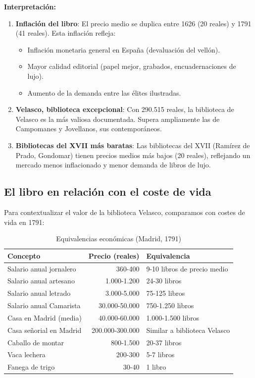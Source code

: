 \documentclass[11pt,a4paper]{article}
\begin{document}
\textbf{Interpretación:}

\begin{enumerate}
\item \textbf{Inflación del libro}: El precio medio se duplica entre 1626 (20 reales) y 1791 (41 reales). Esta inflación refleja:
\begin{itemize}
\item Inflación monetaria general en España (devaluación del vellón).
\item Mayor calidad editorial (papel mejor, grabados, encuadernaciones de lujo).
\item Aumento de la demanda entre las élites ilustradas.
\end{itemize}

\item \textbf{Velasco, biblioteca excepcional}: Con 290.515 reales, la biblioteca de Velasco es la más valiosa documentada. Supera ampliamente las de Campomanes y Jovellanos, sus contemporáneos.

\item \textbf{Bibliotecas del XVII más baratas}: Las bibliotecas del XVII (Ramírez de Prado, Gondomar) tienen precios medios más bajos (20 reales), reflejando un mercado menos inflacionado y menor demanda de libros de lujo.
\end{enumerate}

\subsection{El libro en relación con el coste de vida}

Para contextualizar el valor de la biblioteca Velasco, comparamos con costes de vida en 1791:

\begin{table}[h]
\centering
\begin{tabular}{lrl}
\toprule
\textbf{Concepto} & \textbf{Precio (reales)} & \textbf{Equivalencia} \\
\midrule
Salario anual jornalero & 360-400 & 9-10 libros de precio medio \\
Salario anual artesano & 1.000-1.200 & 24-30 libros \\
Salario anual letrado & 3.000-5.000 & 75-125 libros \\
Salario anual Camarista & 30.000-50.000 & 750-1.250 libros \\
Casa en Madrid (media) & 40.000-60.000 & 1.000-1.500 libros \\
Casa señorial en Madrid & 200.000-300.000 & Similar a biblioteca Velasco \\
Caballo de montar & 800-1.500 & 20-37 libros \\
Vaca lechera & 200-300 & 5-7 libros \\
Fanega de trigo & 30-40 & 1 libro \\
\bottomrule
\end{tabular}
\caption{Equivalencias económicas (Madrid, 1791)}
\end{table}
\end{document}
